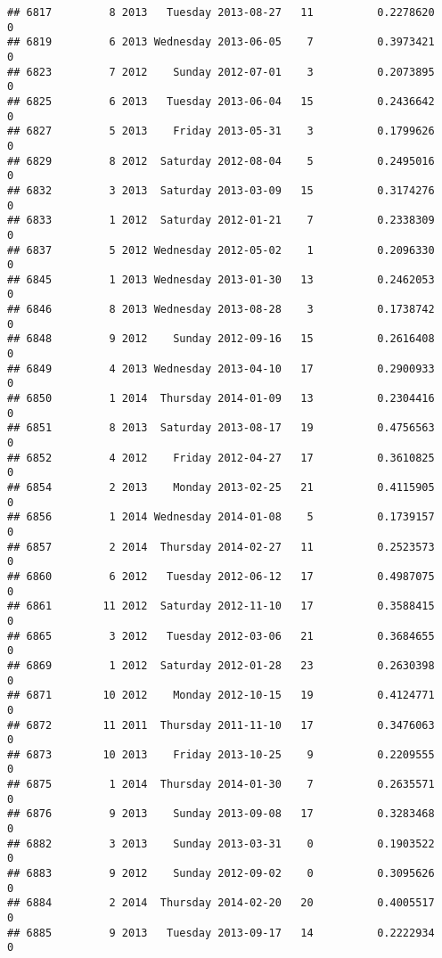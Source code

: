 \documentclass[
]{article}
\begin{document}
\begin{verbatim}
## 6817         8 2013   Tuesday 2013-08-27   11          0.2278620             0
## 6819         6 2013 Wednesday 2013-06-05    7          0.3973421             0
## 6823         7 2012    Sunday 2012-07-01    3          0.2073895             0
## 6825         6 2013   Tuesday 2013-06-04   15          0.2436642             0
## 6827         5 2013    Friday 2013-05-31    3          0.1799626             0
## 6829         8 2012  Saturday 2012-08-04    5          0.2495016             0
## 6832         3 2013  Saturday 2013-03-09   15          0.3174276             0
## 6833         1 2012  Saturday 2012-01-21    7          0.2338309             0
## 6837         5 2012 Wednesday 2012-05-02    1          0.2096330             0
## 6845         1 2013 Wednesday 2013-01-30   13          0.2462053             0
## 6846         8 2013 Wednesday 2013-08-28    3          0.1738742             0
## 6848         9 2012    Sunday 2012-09-16   15          0.2616408             0
## 6849         4 2013 Wednesday 2013-04-10   17          0.2900933             0
## 6850         1 2014  Thursday 2014-01-09   13          0.2304416             0
## 6851         8 2013  Saturday 2013-08-17   19          0.4756563             0
## 6852         4 2012    Friday 2012-04-27   17          0.3610825             0
## 6854         2 2013    Monday 2013-02-25   21          0.4115905             0
## 6856         1 2014 Wednesday 2014-01-08    5          0.1739157             0
## 6857         2 2014  Thursday 2014-02-27   11          0.2523573             0
## 6860         6 2012   Tuesday 2012-06-12   17          0.4987075             0
## 6861        11 2012  Saturday 2012-11-10   17          0.3588415             0
## 6865         3 2012   Tuesday 2012-03-06   21          0.3684655             0
## 6869         1 2012  Saturday 2012-01-28   23          0.2630398             0
## 6871        10 2012    Monday 2012-10-15   19          0.4124771             0
## 6872        11 2011  Thursday 2011-11-10   17          0.3476063             0
## 6873        10 2013    Friday 2013-10-25    9          0.2209555             0
## 6875         1 2014  Thursday 2014-01-30    7          0.2635571             0
## 6876         9 2013    Sunday 2013-09-08   17          0.3283468             0
## 6882         3 2013    Sunday 2013-03-31    0          0.1903522             0
## 6883         9 2012    Sunday 2012-09-02    0          0.3095626             0
## 6884         2 2014  Thursday 2014-02-20   20          0.4005517             0
## 6885         9 2013   Tuesday 2013-09-17   14          0.2222934             0

\end{verbatim}
\end{document}
